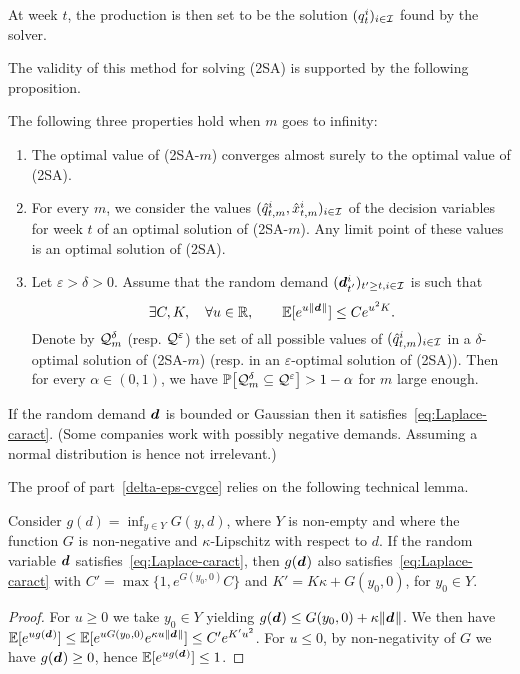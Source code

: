 At week $t$, the production is then set to be the solution $(q_t^i)_{i\in\mathcal{I}}$ found by the solver.

The validity of this method for solving (2SA) is supported by the following proposition.

\begin{prop}
\label{prop:cvgce-2SAm}
The following three properties hold when $m$ goes to infinity:
\begin{enumerate}[label=\textup{(\roman*)}]
\item The optimal value of \textup{(2SA-$m$)} converges almost surely to the optimal value of \textup{(2SA)}.

\item For every $m$, we consider the values $(\hat{q}_{t,m}^i,\hat{x}_{t,m}^i)_{i\in\mathcal{I}}$ of the decision variables for week $t$ of an optimal solution of \textup{(2SA-$m$)}. Any limit point of these values is an optimal solution of \textup{(2SA)}.

\item \label{delta-eps-cvgce}Let $\varepsilon> \delta > 0$. Assume that the random demand $(\va\demand_{t'}^i)_{t'\geq t, i\in\REF}$ is such that
\begin{equation}
\exists C,K, \quad \forall u \in \RR, \qquad \EE[e^{u \|\va d\|}] \leq C e^{u^2 K} . \label{eq:Laplace-caract}
\end{equation}
 Denote by $\mathcal{Q}_m^{\delta}$ (resp. $\mathcal{Q}^{\varepsilon}$) the set of all possible values of $(\hat {q}_{t,m}^i)_{i\in\mathcal{I}}$ in a $\delta$-optimal solution of \textup{(2SA-$m$)} (resp. in an $\varepsilon$-optimal solution of \textup{(2SA)}). Then for every $\alpha \in (0,1)$, we have $ \PP\sqbracket{\cQ_m^{\delta}\subseteq\cQ^{\varepsilon}} > 1 - \alpha$ for $m$ large enough.
\end{enumerate}
\end{prop}

If the random demand $\va\demand$ is bounded or Gaussian then it satisfies~\eqref{eq:Laplace-caract}. (Some companies work with possibly negative demands. Assuming a normal distribution is hence not irrelevant.) 


The proof of part~\ref{delta-eps-cvgce} relies on the following technical lemma.
\begin{lem}
\label{lem:Laplace-caract}
Consider $g(d) = \inf_{y \in Y} G(y,d)$, where $Y$ is non-empty and where the function $G$
is non-negative and $\kappa$-Lipschitz with respect to $d$.
If the random variable $\va d$ satisfies~\eqref{eq:Laplace-caract},
then $g(\va d)$ also satisfies~\eqref{eq:Laplace-caract}
with $C' = \max \{ 1 , e^{G(y_0,0)}C\}$ and $K' = K \kappa + G(y_0,0)$, for $y_0 \in Y$.
\end{lem}
\begin{proof}
For $u \geq 0$ we take $y_0 \in Y$ yielding $g(\va d) \leq  G(y_0,0) + \kappa \|\va d\|$.
We then have $ \EE[e^{u g(\va d)}] \leq  \EE[e^{uG(y_0,0)} e^{\kappa u \|\va d\|}] \leq C' e^{ K' u^2}$.
For $u\leq 0$, by non-negativity of $G$ we have $g({\va d}) \geq 0$, hence $\EE[e^{u g(\va d)}] \leq 1$.
\end{proof}

